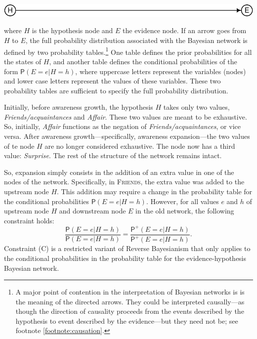 \documentclass[
  11pt,
  dvipsnames,enabledeprecatedfontcommands]{scrartcl}
\newcommand{\pr}[1]{\ensuremath{\mathsf{P}(#1)}}
\newcommand{\ppr}[2]{\ensuremath{\mathsf{P}^{#1}(#2)}}
\begin{document}
\begin{center}\includegraphics[width=0.5\linewidth,height=0.5\textheight]{ReplyToSteeleStefansson5_files/figure-latex/heDAG-prel-1} \end{center}

\noindent where \(H\) is the hypothesis node and \(E\) the evidence
node. If an arrow goes from \(H\) to \(E\), the full probability
distribution associated with the Bayesian network is defined by two
probability tables.\footnote{A major point of contention in the
  interpretation of Bayesian networks is is the meaning of the directed
  arrows. They could be interpreted causally---as though the direction
  of causality proceeds from the events described by the hypothesis to
  event described by the evidence---but they need not be; see footnote
  \ref{footnote:causation}.} One table defines the prior probabilities
for all the states of \(H\), and another table defines the conditional
probabilities of the form \(\pr{E=e \vert H=h}\), where uppercase
letters represent the variables (nodes) and lower case letters represent
the values of these variables. These two probability tables are
sufficient to specify the full probability distribution.

Initially, before awareness growth, the hypothesis \(H\) takes only two
values, \textit{Friends/acquaintances} and \textit{Affair}. These two
values are meant to be exhaustive. So, initially, \textit{Affair}
functions as the negation of \textit{Friends/acquaintances}, or vice
versa. After awareness growth---specifically, awareness expansion---the
two values of te node \(H\) are no longer considered exhaustive. The
node now has a third value: \textit{Surprise}. The rest of the structure
of the network remains intact.

So, expansion simply consists in the addition of an extra value in one
of the nodes of the network. Specifically, in \textsc{Friends}, the
extra value was added to the upstream node \(H\). This addition may
require a change in the probability table for the conditional
probabilities \(\pr{E=e \vert H=h}\). However, for all values \(e\) and
\(h\) of upstream node \(H\) and downstream node \(E\) in the old
network, the following constraint holds:
\[\frac{\pr{E=e \vert H=h}}{\pr{E=e \vert H=h}} = \frac{\ppr{+}{E=e \vert H=h}}{\ppr{+}{E=e \vert H=h}}. \tag{C}\]
Constraint (C) is a restricted variant of Reverse Bayesianism that only
applies to the conditional probabilities in the probability table for
the evidence-hypothesis Bayesian network.
\end{document}
